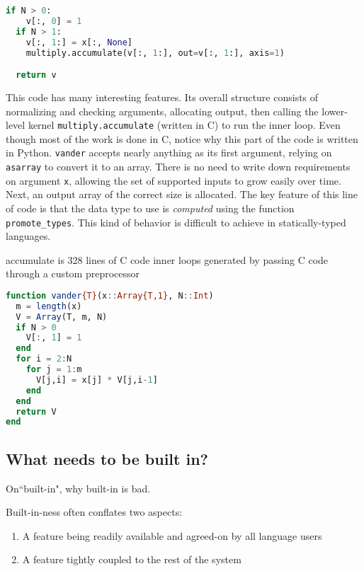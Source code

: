 {\begin{singlespace}
\begin{lstlisting}[language=python,style=ttcode]
  if N > 0:
    v[:, 0] = 1
  if N > 1:
    v[:, 1:] = x[:, None]
    multiply.accumulate(v[:, 1:], out=v[:, 1:], axis=1)

  return v
\end{lstlisting}
\end{singlespace}

This code has many interesting features.
Its overall structure consists of normalizing and checking arguments,
allocating output, then calling the lower-level kernel \texttt{multiply.accumulate}
(written in C) to run the inner loop.
Even though most of the work is done in C, notice why this part of the
code is written in Python.
\texttt{vander} accepts nearly anything as its first argument, relying on
\texttt{asarray} to convert it to an array.
There is no need to write down requirements on argument \texttt{x}, allowing
the set of supported inputs to grow easily over time.
Next, an output array of the correct size is allocated.
The key feature of this line of code is that the data type to use is
\emph{computed} using the function \texttt{promote_types}.
This kind of behavior is difficult to achieve in statically-typed languages.

accumulate is 328 lines of C code
inner loops generated by passing C code through a custom preprocessor


\begin{singlespace}
\begin{lstlisting}[language=julia]
function vander{T}(x::Array{T,1}, N::Int)
  m = length(x)
  V = Array(T, m, N)
  if N > 0
    V[:, 1] = 1
  end
  for i = 2:N
    for j = 1:m
      V[j,i] = x[j] * V[j,i-1]
    end
  end
  return V
end
\end{lstlisting}
\end{singlespace}

\subsection{What needs to be built in?}

On``built-in", why built-in is bad.

Built-in-ness often conflates two aspects:

\begin{enumerate}
\item A feature being readily available and agreed-on by all language users
\item A feature tightly coupled to the rest of the system
\end{enumerate}

}
